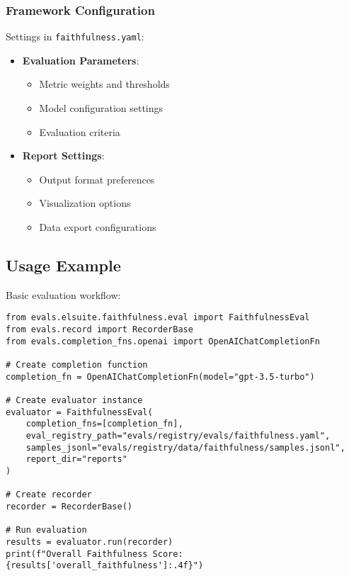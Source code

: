 \subsubsection{Framework Configuration}
Settings in \texttt{faithfulness.yaml}:
\begin{itemize}
    \item \textbf{Evaluation Parameters}:
    \begin{itemize}
        \item Metric weights and thresholds
        \item Model configuration settings
        \item Evaluation criteria
    \end{itemize}
    \item \textbf{Report Settings}:
    \begin{itemize}
        \item Output format preferences
        \item Visualization options
        \item Data export configurations
    \end{itemize}
\end{itemize}

\subsection{Usage Example}
Basic evaluation workflow:

\begin{lstlisting}[basicstyle=\ttfamily\small,breaklines=true,columns=flexible]
from evals.elsuite.faithfulness.eval import FaithfulnessEval
from evals.record import RecorderBase
from evals.completion_fns.openai import OpenAIChatCompletionFn

# Create completion function
completion_fn = OpenAIChatCompletionFn(model="gpt-3.5-turbo")

# Create evaluator instance
evaluator = FaithfulnessEval(
    completion_fns=[completion_fn],
    eval_registry_path="evals/registry/evals/faithfulness.yaml",
    samples_jsonl="evals/registry/data/faithfulness/samples.jsonl",
    report_dir="reports"
)

# Create recorder
recorder = RecorderBase()

# Run evaluation
results = evaluator.run(recorder)
print(f"Overall Faithfulness Score: {results['overall_faithfulness']:.4f}")
\end{lstlisting}